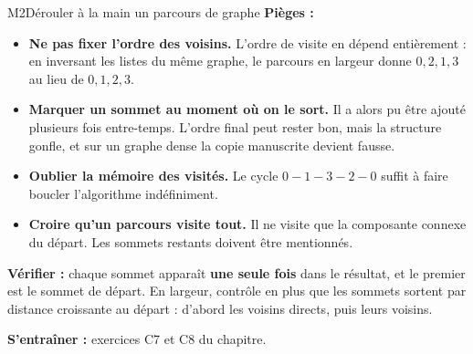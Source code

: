\begin{fichemethode}{M2}{Dérouler à la main un parcours de graphe}
\textbf{Pièges :}
\begin{itemize}
  \item \textbf{Ne pas fixer l'ordre des voisins.} L'ordre de visite en dépend entièrement :
    en inversant les listes du même graphe, le parcours en largeur donne $0, 2, 1, 3$ au lieu
    de $0, 1, 2, 3$.
  \item \textbf{Marquer un sommet au moment où on le sort.} Il a alors pu être ajouté
    plusieurs fois entre-temps. L'ordre final peut rester bon, mais la structure gonfle, et
    sur un graphe dense la copie manuscrite devient fausse.
  \item \textbf{Oublier la mémoire des visités.} Le cycle $0-1-3-2-0$ suffit à faire boucler
    l'algorithme indéfiniment.
  \item \textbf{Croire qu'un parcours visite tout.} Il ne visite que la composante connexe du
    départ. Les sommets restants doivent être mentionnés.
\end{itemize}

\textbf{Vérifier :} chaque sommet apparaît \textbf{une seule fois} dans le résultat, et le
premier est le sommet de départ. En largeur, contrôle en plus que les sommets sortent par
distance croissante au départ : d'abord les voisins directs, puis leurs voisins.

\textbf{S'entraîner :} exercices C7 et C8 du chapitre.
\end{fichemethode}
